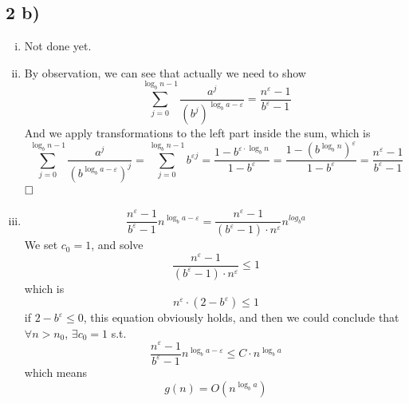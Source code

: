 \documentclass[A4paper]{article}
\newcommand{\qedhere}{$\hfill\ensuremath{\square}$}
\begin{document}
\subsection*{2 b)}
\begin{enumerate}[i)]
\item  Not done yet.
\item 
By observation, we can see that actually we need to show
\[
	\sum_{j=0}^{\log_bn-1} \frac{a^j}{(b^j)^{\log_b a- \varepsilon}} = \frac{n^\varepsilon -1}{b^\varepsilon -1}
\]	
And we apply transformations to the left part inside the sum, which is 
\[
	\sum_{j=0}^{\log_bn-1} \frac{a^j}{(b^{\log_b a- \varepsilon})^j} = \sum_{j=0}^{\log_bn-1} b^{\varepsilon j} = \frac{1-b^{\varepsilon \cdot \log_bn}}{1-b^ \varepsilon} =  \frac{1-(b^{\log_bn})^{\varepsilon}}{1-b^ \varepsilon}= \frac{n^\varepsilon -1}{b^\varepsilon -1}
\]
\qedhere

\item 
\[
	\frac{n^\varepsilon-1}{b^\varepsilon-1} n^{\log_b a - \varepsilon} = \frac{n^\varepsilon-1}{(b^\varepsilon -1)\cdot n^\varepsilon} n^{log_ba} 
\]
We set $c_0 = 1$, and solve \[
	\frac{n^\varepsilon-1}{(b^\varepsilon -1)\cdot n^\varepsilon} \leq 1
\]	
which is 
\[
	n^\varepsilon \cdot (2- b^ \varepsilon) \leq 1
\]
if $2- b^\varepsilon \leq 0$, this equation obviously holds, and then we could conclude that $\forall n > n_0$, $\exists c_0 = 1$ s.t.
\[
	\frac{n^\varepsilon-1}{b^\varepsilon-1} n^{\log_b a - \varepsilon}  \leq C\cdot  n^{\log_ba}
\]
which means \[
	g(n) = O(n^{\log_ba})
\]

\end{enumerate}
\end{document}
